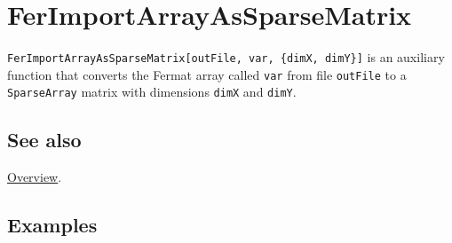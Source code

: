 \documentclass[../FeynHelpersManual.tex]{subfiles}
\begin{document}
\hypertarget{ferimportarrayassparsematrix}{
\section{FerImportArrayAsSparseMatrix}\label{ferimportarrayassparsematrix}}

\texttt{FerImportArrayAsSparseMatrix[\allowbreak{}outFile,\ \allowbreak{}var,\ \allowbreak{}\{\allowbreak{}dimX,\ \allowbreak{}dimY\}]}
is an auxiliary function that converts the Fermat array called
\texttt{var} from file \texttt{outFile} to a \texttt{SparseArray} matrix
with dimensions \texttt{dimX} and \texttt{dimY}.

\subsection{See also}

\hyperlink{toc}{Overview}.

\subsection{Examples}
\end{document}
